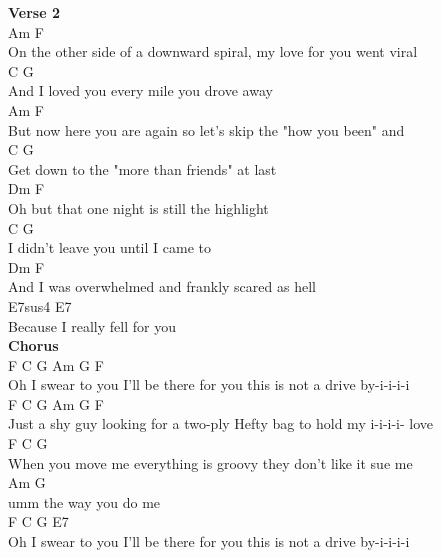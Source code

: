 \documentclass[a4paper]{article}
\begin{document}
{{        }
        \textbf{Verse 2}
        ~\\
        {
            \cutive
            \obeyspaces
Am                                     F
\\
On the other side of a downward spiral, my love for you went viral 
\\
C                          G
\\
And I loved you every mile you drove away 
\\
Am                            F
\\
But now here you are again so let's skip the "how you been" and 
\\
C                             G
\\
Get down to the "more than friends" at last
\\
Dm                    F
\\
Oh but that one night is still the highlight 
\\
C                  G
\\
I didn't leave you until I came to
\\
Dm                    F
\\
And I was overwhelmed and frankly scared as hell 
\\
E7sus4           E7
\\
Because I really fell for you
\\

        }
        \textbf{Chorus}
        ~\\
        {
            \cutive
            \obeyspaces
F                 C                     G                   Am   G   F
\\
Oh I swear to you I'll be there for you this is not a drive by-i-i-i-i
\\
F              C                     G                    Am  G      F
\\
Just a shy guy looking for a two-ply Hefty bag to hold my i-i-i-i- love 
\\
F                C                    G
\\
When you move me everything is groovy they don't like it sue me 
\\
Am              G
\\
umm the way you do me 
\\
F                 C                     G                   E7
\\
Oh I swear to you I'll be there for you this is not a drive by-i-i-i-i
\\

}}
\end{document}
